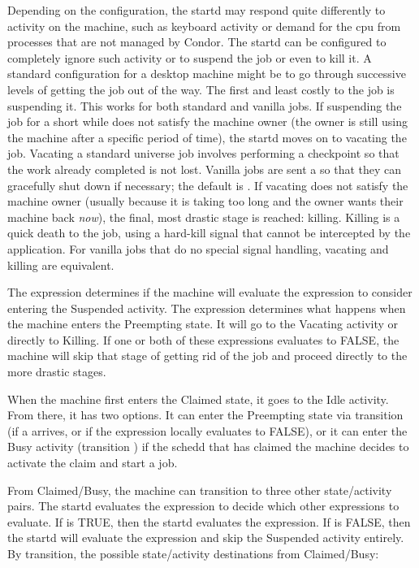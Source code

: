 Depending on the configuration, the startd may respond quite
differently to activity on the machine, such as keyboard activity or
demand for the cpu from processes that are not managed by Condor.  The
startd can be configured to completely ignore such activity or to
suspend the job or even to kill it.  A standard configuration for a desktop
machine might be to go through
successive levels of getting the job out of the way.
The first and least costly to the job is suspending it.
This works for both standard and vanilla jobs.
If suspending the job for a short while does not satisfy the machine
owner (the owner is still using the machine after a specific period of
time), the startd moves on to vacating the job.
Vacating a standard universe job
involves performing a checkpoint so that the work already completed
is not lost.  Vanilla jobs are sent a  so that they
can gracefully shut down if necessary; the default is \verb@SIGTERM@.
If vacating does not satisfy the machine owner (usually because it is
taking too long and the owner wants their machine back \emph{now}),
the final, most drastic stage is reached: killing.  
Killing is a quick death to the job, using a hard-kill signal that cannot
be intercepted by the application.  For vanilla jobs that do no special
signal handling, vacating and killing are equivalent.

The  expression determines if the machine will
evaluate the  expression to consider entering the
Suspended activity.
The  expression determines what happens when the
machine enters the Preempting state.
It will go to the Vacating
activity or directly to Killing. 
If one or both of these expressions evaluates to FALSE, the machine
will skip that stage of getting rid of the job and proceed directly to
the more drastic stages.

When the machine first enters the Claimed state, it goes to the Idle
activity.  From there, it has two options.  
It can enter the Preempting state via transition  (if a 
 arrives, or if the  expression locally
evaluates to FALSE),  
or it can enter the Busy activity (transition ) if the
schedd that has claimed the machine decides to activate the claim and
start a job.

From Claimed/Busy, the machine can transition to three other state/activity
pairs.
The startd evaluates the  expression to decide
which other expressions to evaluate.  
If  is TRUE, then the startd evaluates the
 expression.
If  is FALSE, then the startd will
evaluate the  expression and skip the Suspended activity
entirely.
By transition, the possible state/activity destinations from Claimed/Busy:

